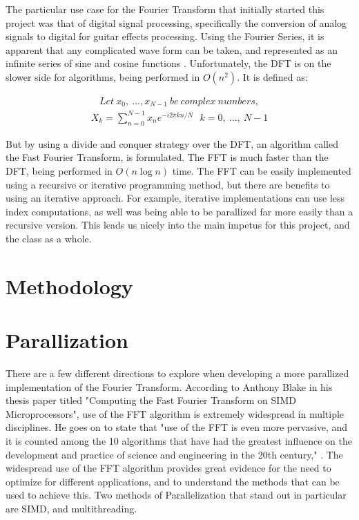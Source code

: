 \documentclass[12pt]{extarticle}
\begin{document}
    The particular use case for the Fourier Transform that initially started this project was that of  digital signal processing, specifically the conversion of analog signals to digital for guitar effects processing.
    Using the Fourier Series, it is apparent that any complicated wave form can be taken,
    and represented as an infinite series of sine and cosine functions \cite{Liu:2021}.
    Unfortunately, the DFT is on the slower side for algorithms, being performed in $O(n^2)$.
    It is defined as:
    
	\begin{align*}
		Let\ x_{0},\ ..., x_{N-1}\ be\ complex\ numbers,
	\end{align*}
	\begin{align}
		X_{k} = \sum_{n=0}^{N-1}x_{n}e^{-i 2 \pi k n / N}\ \ \ k = 0,\ ...,\ N-1
    \end{align}

    But by using a divide and conquer strategy over the DFT, an algorithm called the Fast Fourier Transform, is formulated.
	The FFT is much faster than the DFT, being performed in $O(n\log{}n)$ time. The FFT can be easily implemented using a recursive or iterative programming method, but there are benefits to using an iterative approach. 
    For example, iterative implementations can use less index computations, as well was being able to be parallized far more easily than a recursive version.
    This leads us nicely into the main impetus for this project, and the class as a whole.

\maketitle
\newpage
\section*{Methodology}
\section*{Parallization} 
    
    There are a few different directions to explore when developing a more
    parallized implementation of the Fourier Transform. 
    According to Anthony Blake in his thesis paper titled "Computing the Fast Fourier Transform on SIMD Microprocessors",
    use of the FFT algorithm is extremely widespread in multiple disciplines. He goes on to state that 
    "use of the FFT is even more pervasive, and it is counted among the 10 algorithms that have had the greatest influence 
    on the development and practice of science and engineering in the 20th century," \cite{Blake:2012}.
    The widespread use of the FFT algorithm provides great evidence for the need to optimize for different applications,
    and to understand the methods that can be used to achieve this.
    Two methods of Parallelization that stand out in particular are SIMD, and multithreading.
\end{document}
